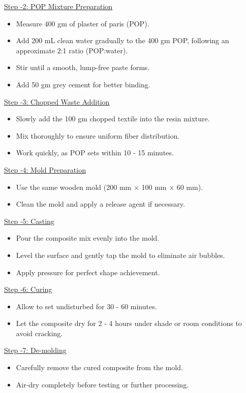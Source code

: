 \noindent\underline{Step -2: POP Mixture Preparation}
\begin{itemize}[leftmargin=1.5cm]
    \item Measure 400 gm of plaster of paris (POP).
    \item Add 200 mL clean water gradually to the 400 gm POP, following an approximate 2:1 ratio (POP:water).
    \item Stir until a smooth, lump-free paste forms.
    \item Add 50 gm grey cement for better binding.
\end{itemize}

\noindent\underline{Step -3: Chopped Waste Addition }
\begin{itemize}[leftmargin=1.5cm]
    \item Slowly add the 100 gm chopped textile into the resin mixture.
    \item Mix thoroughly to ensure uniform fiber distribution.
    \item Work quickly, as POP sets within 10 - 15 minutes.
\end{itemize}

\noindent\underline{Step -4: Mold Preparation }
\begin{itemize}
    \item Use the same wooden mold (200 mm $\times$ 100 mm $\times$ 60 mm).
    \item Clean the mold and apply a release agent if necessary.
\end{itemize}

\noindent\underline{Step -5: Casting }
\begin{itemize}[leftmargin=1.5cm]
    \item Pour the composite mix evenly into the mold.
    \item Level the surface and gently tap the mold to eliminate air bubbles.
    \item Apply pressure for perfect shape achievement.
\end{itemize}

\noindent\underline{Step -6: Curing }
\begin{itemize}[leftmargin=1.5cm]
    \item Allow to set undisturbed for 30 - 60 minutes.
    \item Let the composite dry for 2 - 4 hours under shade or room conditions to avoid cracking.
\end{itemize}

\noindent\underline{Step -7: De-molding } 
\begin{itemize}[leftmargin=1.5cm]
    \item Carefully remove the cured composite from the mold.
    \item Air-dry completely before testing or further processing.
\end{itemize}

